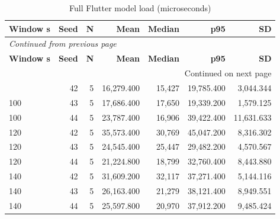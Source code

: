 \documentclass[10pt,a4paper]{article}
\begin{document}
\begin{longtable}{@{}lrrrrrr@{}}
\caption{Full Flutter model load (microseconds)}\\
\toprule
\textbf{Window s} & \textbf{Seed} & \textbf{N} & \textbf{Mean} & \textbf{Median} & \textbf{p95} & \textbf{SD} \\
\midrule\endfirsthead
\multicolumn{7}{l}{\small\itshape Continued from previous page}\\
\toprule
\textbf{Window s} & \textbf{Seed} & \textbf{N} & \textbf{Mean} & \textbf{Median} & \textbf{p95} & \textbf{SD} \\
\midrule\endhead
\midrule\multicolumn{7}{r}{\small Continued on next page}\\\endfoot
\bottomrule\endlastfoot
100 & 42 & 5 & 16,279.400 & 15,427 & 19,785.400 & 3,044.344 \\
100 & 43 & 5 & 17,686.400 & 17,650 & 19,339.200 & 1,579.125 \\
100 & 44 & 5 & 23,787.400 & 16,906 & 39,422.400 & 11,631.633 \\
120 & 42 & 5 & 35,573.400 & 30,769 & 45,047.200 & 8,316.302 \\
120 & 43 & 5 & 24,545.400 & 25,447 & 29,482.200 & 4,570.567 \\
120 & 44 & 5 & 21,224.800 & 18,799 & 32,760.400 & 8,443.880 \\
140 & 42 & 5 & 31,609.200 & 32,117 & 37,271.400 & 5,144.116 \\
140 & 43 & 5 & 26,163.400 & 21,279 & 38,121.400 & 8,949.551 \\
140 & 44 & 5 & 25,597.800 & 20,970 & 37,912.200 & 9,485.424 \\
\end{longtable}\endgroup
\begingroup\small\setlength{\tabcolsep}{4pt}\renewcommand{\arraystretch}{1.12}
\end{document}
